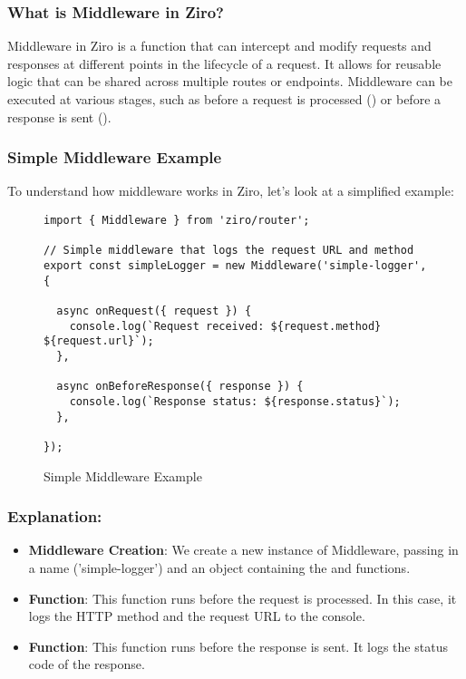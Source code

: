 \subsubsection*{What is Middleware in Ziro?}
Middleware in Ziro is a function that can intercept and modify requests and responses at different points in the lifecycle of a request. It allows for reusable logic that can be shared across multiple routes or endpoints. Middleware can be executed at various stages, such as before a request is processed () or before a response is sent ().

\subsubsection*{Simple Middleware Example}
To understand how middleware works in Ziro, let’s look at a simplified example:
\begin{figure}[h!]
\begin{verbatim}
import { Middleware } from 'ziro/router';

// Simple middleware that logs the request URL and method
export const simpleLogger = new Middleware('simple-logger', {

  async onRequest({ request }) {
    console.log(`Request received: ${request.method} ${request.url}`);
  },

  async onBeforeResponse({ response }) {
    console.log(`Response status: ${response.status}`);
  },

});
\end{verbatim}
\caption{Simple Middleware Example}
\end{figure}

\subsubsection*{Explanation:}

\begin{itemize}
  \item \textbf{Middleware Creation}: We create a new instance of Middleware, passing in a name ('simple-logger') and an object containing the  and  functions.
  \item \textbf{ Function}: This function runs before the request is processed. In this case, it logs the HTTP method and the request URL to the console.
  \item \textbf{ Function}: This function runs before the response is sent. It logs the status code of the response.
\end{itemize}

